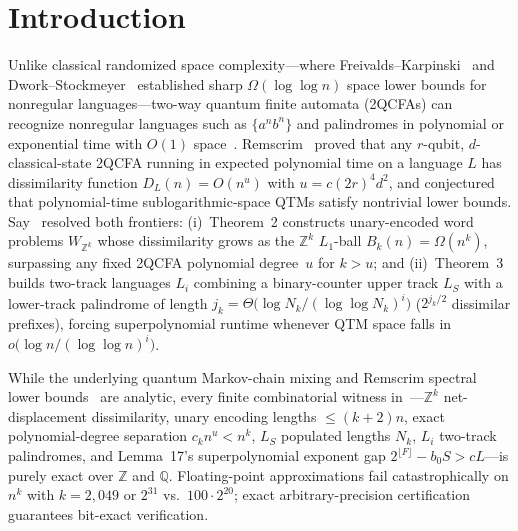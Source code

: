 \documentclass[11pt,twocolumn]{article}
\newcommand{\ZZ}{\mathbb{Z}}
\newcommand{\QQ}{\mathbb{Q}}
\begin{document}
\section{Introduction}
Unlike classical randomized space complexity—where Freivalds--Karpinski~\cite{freivalds1994space} and Dwork--Stockmeyer~\cite{dwork1990time} established sharp $\Omega(\log\log n)$ space lower bounds for nonregular languages—two-way quantum finite automata (2QCFAs) can recognize nonregular languages such as $\{a^n b^n\}$ and palindromes in polynomial or exponential time with $O(1)$ space~\cite{remscrim2020power}. Remscrim~\cite{remscrim2021lower} proved that any $r$-qubit, $d$-classical-state 2QCFA running in expected polynomial time on a language $L$ has dissimilarity function $D_L(n) = O(n^u)$ with $u = c(2r)^4 d^2$, and conjectured that polynomial-time sublogarithmic-space QTMs satisfy nontrivial lower bounds. Say~\cite{say2026quantumspace} resolved both frontiers: (i)~Theorem~2 constructs unary-encoded word problems $W_{\ZZ^k}$ whose dissimilarity grows as the $\ZZ^k$ $L_1$-ball $B_k(n) = \Omega(n^k)$, surpassing any fixed 2QCFA polynomial degree~$u$ for $k > u$; and (ii)~Theorem~3 builds two-track languages $L_i$ combining a binary-counter upper track $L_S$ with a lower-track palindrome of length $j_k = \Theta\!\bigl(\log N_k / (\log\log N_k)^i\bigr)$ ($2^{j_k/2}$ dissimilar prefixes), forcing superpolynomial runtime whenever QTM space falls in $o\!\bigl(\log n / (\log\log n)^i\bigr)$.

While the underlying quantum Markov-chain mixing and Remscrim spectral lower bounds~\cite{remscrim2021lower} are analytic, every finite combinatorial witness in~\cite{say2026quantumspace}—$\ZZ^k$ net-displacement dissimilarity, unary encoding lengths $\le (k+2)n$, exact polynomial-degree separation $c_k n^u < n^k$, $L_S$ populated lengths $N_k$, $L_i$ two-track palindromes, and Lemma~17's superpolynomial exponent gap $2^{\lfloor F \rfloor} - b_0 S > c L$—is purely exact over $\ZZ$ and $\QQ$. Floating-point approximations fail catastrophically on $n^k$ with $k = 2{,}049$ or $2^{31}$ vs.\ $100\cdot 2^{20}$; exact arbitrary-precision certification guarantees bit-exact verification.
\end{document}
